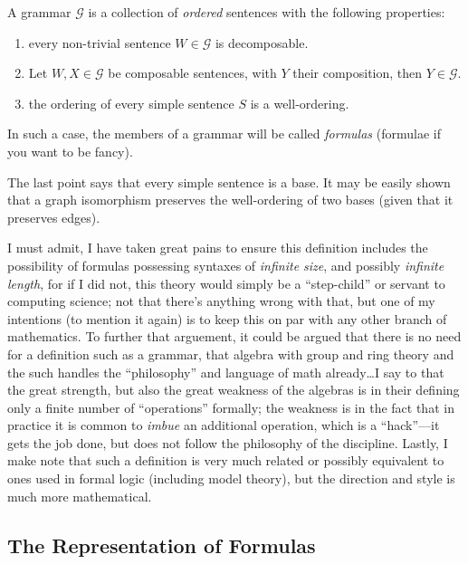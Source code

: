 \documentclass[twoside]{article}
\newenvironment{definition}[1][Definition]{\begin{trivlist}
\item[\hskip \labelsep {\bfseries #1}]}{\end{trivlist}}
\begin{document}
\begin{definition}[Grammar]

A grammar $ \mathcal{G} $ is a collection of \emph{ordered} sentences with the following properties:

\begin{enumerate}

\item every non-trivial sentence $ W\in\mathcal{G} $ is decomposable.

\item Let $ W, X\in\mathcal{G} $ be composable sentences, with $ Y $ their composition, then $ Y\in\mathcal{G} $.

\item the ordering of every simple sentence $ S $ is a well-ordering.

\end{enumerate}
In such a case, the members of a grammar will be called \emph{formulas} (formulae if you want to be fancy).

\end{definition}
The last point says that every simple sentence is a base.  It may be easily shown that a graph isomorphism preserves
the well-ordering of two bases (given that it preserves edges).

I must admit, I have taken great pains to ensure this definition includes the possibility of formulas possessing
syntaxes of \emph{infinite size}, and possibly \emph{infinite length}, for if I did not, this theory would simply
be a ``step-child'' or servant to computing science; not that there's anything wrong with that, but one of my
intentions (to mention it again) is to keep this on par with any other branch of mathematics.  To further that
arguement, it could be argued that there is no need for a definition such as a grammar, that algebra with group
and ring theory and the such handles the ``philosophy'' and language of math already\ldots I say to that the great
strength, but also the great weakness of the algebras is in their defining only a finite number of ``operations''
formally; the weakness is in the fact that in practice it is common to \emph{imbue} an additional operation, which
is a ``hack''---it gets the job done, but does not follow the philosophy of the discipline.  Lastly, I make note
that such a definition is very much related or possibly equivalent to ones used in formal logic (including model
theory), but the direction and style is much more mathematical.

\subsection{The Representation of Formulas}
\end{document}
